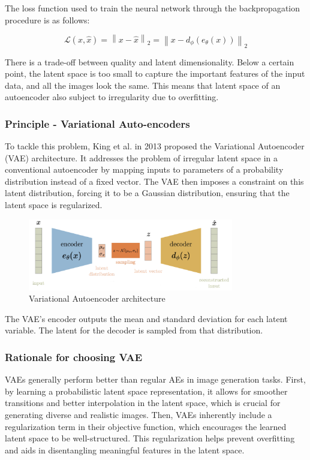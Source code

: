 \documentclass{article}
\begin{document}
The loss function used to train the neural network through the backpropagation procedure is as follows: 

\[\mathcal{L}(x,\hat{x})=\left\| x-\hat{x}\right\|_{2}=\left\| x-d_{\phi}(e_{\theta}(x)) \right\|_{2}\]

There is a trade-off between quality and latent dimensionality. Below a certain point, the latent space is too small to capture the important features of the input data, and all the images look the same.
This means that latent space of an autoencoder also subject to irregularity due to overfitting. 

\subsubsection*{Principle - Variational Auto-encoders}
To tackle this problem, King et al. in 2013 proposed the Variational Autoencoder (VAE) architecture. It addresses the problem of irregular latent space in a conventional autoencoder by mapping inputs to parameters of a probability distribution instead of a fixed vector.
The VAE then imposes a constraint on this latent distribution, forcing it to be a Gaussian distribution, ensuring that the latent space is regularized.

\begin{figure}[H]
    \centering
    \includegraphics[width=0.8\textwidth]{images/vae.png}
    \caption{Variational Autoencoder architecture}
\end{figure}

The VAE's encoder outputs the mean and standard deviation for each latent variable. The latent for the decoder is sampled from that distribution.

\subsubsection*{Rationale for choosing VAE}
VAEs generally perform better than regular AEs in image generation tasks. 
First, by learning a probabilistic latent space representation, it allows for smoother transitions and better interpolation in the latent space, which is crucial for generating diverse and realistic images. 
Then, VAEs inherently include a regularization term in their objective function, which encourages the learned latent space to be well-structured. 
This regularization helps prevent overfitting and aids in disentangling meaningful features in the latent space.
  
\end{document}
